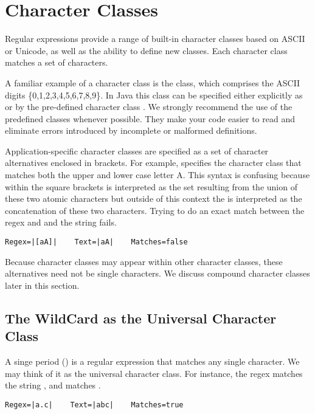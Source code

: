 \section{Character Classes}

Regular expressions provide a range of built-in character classes
based on ASCII or Unicode, as well as the ability to define new
classes.  Each character class matches a set of characters.

A familiar example of a character class is the  class,
which comprises the ASCII digits \{0,1,2,3,4,5,6,7,8,9\}.
In Java this class can be specified either explicitly as \code{[0-9]}
or by the pre-defined character class .
We strongly recommend the use of the predefined classes whenever possible.
They make your code easier to read and eliminate errors introduced by 
incomplete or malformed definitions.

Application-specific character classes are specified as a set of
character alternatives enclosed in brackets.
For example, \code{[aA]} specifies the character class that matches
both the upper and lower case letter A.
This syntax is confusing because within the square brackets
 is interpreted as 
the set resulting from the union of these two atomic characters
but outside of this context the  is interpreted as
the concatenation of these two characters.
Trying to do an exact match between the regex and \code{[aA]}
and the string  fails.
%
\begin{verbatim}
Regex=|[aA]|    Text=|aA|    Matches=false
\end{verbatim}
%
Because character classes may appear within other character classes,
these alternatives need not be single characters.
We discuss compound character classes later in this section.

\subsection{The WildCard as the Universal Character Class}\label{section:regex-wildcard}

A singe period () is a regular expression that matches any
single character.  We may think of it as the universal character class.
For instance, the regex  matches the string ,
and  matches .%
%
\begin{verbatim}
Regex=|a.c|    Text=|abc|    Matches=true
\end{verbatim}
%

